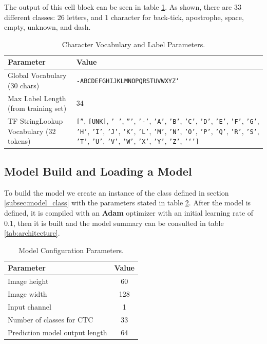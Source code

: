 \documentclass[11pt,letterpaper]{article}
\begin{document}
	The output of this cell block can be seen in table \ref{tab:vocab_params}. As shown, there are 33 different classes: 26 letters, and 1 character for back-tick, apostrophe, space, empty, unknown, and dash.
	
	\begin{table}[!h]
		\centering
		\begin{tabular}{|l|p{10cm}|}
			\hline
			\textbf{Parameter} & \textbf{Value} \\
			\hline
			Global Vocabulary (30 chars) & \texttt{-ABCDEFGHIJKLMNOPQRSTUVWXYZ` } \\
			\hline
			Max Label Length (from training set) & 34 \\
			\hline
			TF StringLookup Vocabulary (32 tokens) &
			\texttt{[''}, \texttt{[UNK]}, \texttt{' '}, \texttt{'''}, \texttt{'-'}, \texttt{'A'}, \texttt{'B'}, \texttt{'C'}, \texttt{'D'}, \texttt{'E'}, \texttt{'F'}, \texttt{'G'}, \texttt{'H'}, \texttt{'I'}, \texttt{'J'}, \texttt{'K'}, \texttt{'L'}, \texttt{'M'}, \texttt{'N'}, \texttt{'O'}, \texttt{'P'}, \texttt{'Q'}, \texttt{'R'}, \texttt{'S'}, \texttt{'T'}, \texttt{'U'}, \texttt{'V'}, \texttt{'W'}, \texttt{'X'}, \texttt{'Y'}, \texttt{'Z'}, \texttt{'`']} \\
			\hline
		\end{tabular}
		\caption{Character Vocabulary and Label Parameters.}
		\label{tab:vocab_params}
	\end{table}
	
	\newpage
	
	\subsection{Model Build and Loading a Model}
	To build the model we create an instance of the class defined in section \ref{subsec:model_class} with the parameters stated in table \ref{tab:model_config}. After the model is defined, it is compiled with an \textbf{Adam} optimizer with an initial learning rate of $0.1$, then it is built and the model summary can be consulted in table \ref{tab:architecture}.
	
	\begin{table}[!h]
		\centering
		\begin{tabular}{|l|c|}
			\hline
			\textbf{Parameter} & \textbf{Value} \\
			\hline
			Image height & 60 \\
			Image width & 128 \\
			Input channel & 1 \\
			Number of classes for CTC & 33 \\
			Prediction model output length & 64 \\
			\hline
		\end{tabular}
		\caption{Model Configuration Parameters.}
		\label{tab:model_config}
	\end{table}
	
\end{document}
